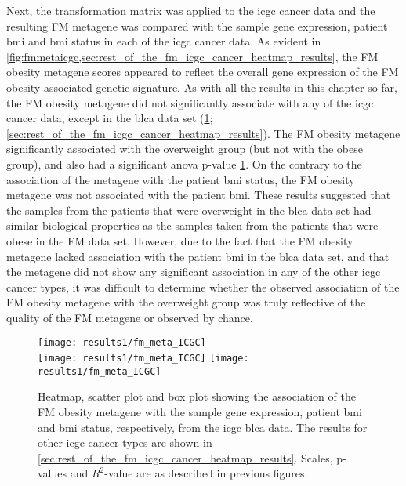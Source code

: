 Next, the transformation matrix was applied to the \gls{icgc} cancer data and the resulting FM metagene was compared with the sample gene expression, patient \gls{bmi} and \gls{bmi} status in each of the \gls{icgc} cancer data.
As evident in \cref{fig:fmmetaicgc,sec:rest_of_the_fm_icgc_cancer_heatmap_results}, the FM obesity metagene scores appeared to reflect the overall gene expression of the FM obesity associated genetic signature.
As with all the results in this chapter so far, the FM obesity metagene did not significantly associate with any of the \gls{icgc} cancer data, except in the \gls{blca} data set (\cref{fig:fmmetaicgc}; \cref{sec:rest_of_the_fm_icgc_cancer_heatmap_results}).
The FM obesity metagene significantly associated with the overweight group (but not with the obese group), and also had a significant \gls{anova} p-value \cref{fig:fmmetaicgc}.
On the contrary to the association of the metagene with the patient \gls{bmi} status, the FM obesity metagene was not associated with the patient \gls{bmi}.
These results suggested that the samples from the patients that were overweight in the \gls{blca} data set had similar biological properties as the samples taken from the patients that were obese in the FM data set.
However, due to the fact that the FM obesity metagene lacked association with the patient \gls{bmi} in the \gls{blca} data set, and that the metagene did not show any significant association in any of the other \gls{icgc} cancer types, it was difficult to determine whether the observed association of the FM obesity metagene with the overweight group was truly reflective of the quality of the FM metagene or observed by chance.

\begin{figure}[htp!]
	\centering
	\texttt{[image: results1/fm\_meta\_ICGC]}\\
	\texttt{[image: results1/fm\_meta\_ICGC]}
	\hfill
	\texttt{[image: results1/fm\_meta\_ICGC]}
	\caption[FM obesity metagene in the \acrshort{icgc} \acrshort{blca} data]{Heatmap, scatter plot and box plot showing the association of the FM obesity metagene with the sample gene expression, patient \gls{bmi} and \gls{bmi} status, respectively, from the \acrshort{icgc} \acrshort{blca} data.
	The results for other \gls{icgc} cancer types are shown in \cref{sec:rest_of_the_fm_icgc_cancer_heatmap_results}.
	Scales, p-values and $R^2$-value are as described in previous figures.}
	\label{fig:fmmetaicgc}
\end{figure}

